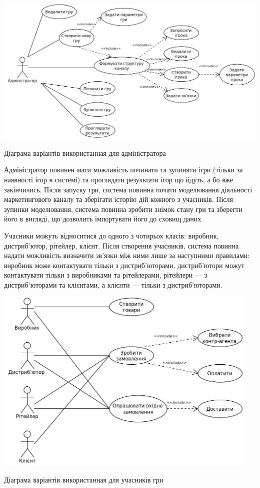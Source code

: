             \begin{stdfigure}
                \includegraphics[width=7in]{images/uml_uc_admin.png}
                \caption{Діаграма варіантів використанная для адміністратора}
                \label{fig:uml_uc_admin}
            \end{stdfigure}

Адміністратор повинен мати можливість починати та зупиняти ігри (тільки за наявності ігор в системі) та проглядати результати ігор що йдуть, а бо вже закінчились. Після запуску гри, система повинна почати моделювання діяльності маркетингового каналу та зберігати історію дій кожного з учасників. Після зупинки моделювання, система повинна зробити знімок стану гри та зберегти його в вигляді, що дозволить імпортувати його до сховищ даних.

Учасники можуть відноситися до одного з чотирьох класів: виробник, дистриб’ютор, рітейлер, клієнт. Після створення учасників, система повинна надати можливість визначити зв’язки між ними лише за наступними правилами: виробник може контактувати тільки з дистриб’юторами, дистриб’ютори можут контактувати тільки з виробниками та рітейлерами, рітейлери --- з дистриб’юторами та клієнтами, а клієнти --- тільки з дистриб’юторами.

            \begin{stdfigure}
                \includegraphics[width=5in]{images/uml_uc_players.png}
                \caption{Діаграма варіантів використанная для учасників гри}
                \label{fig:uml_uc_players}
            \end{stdfigure}

